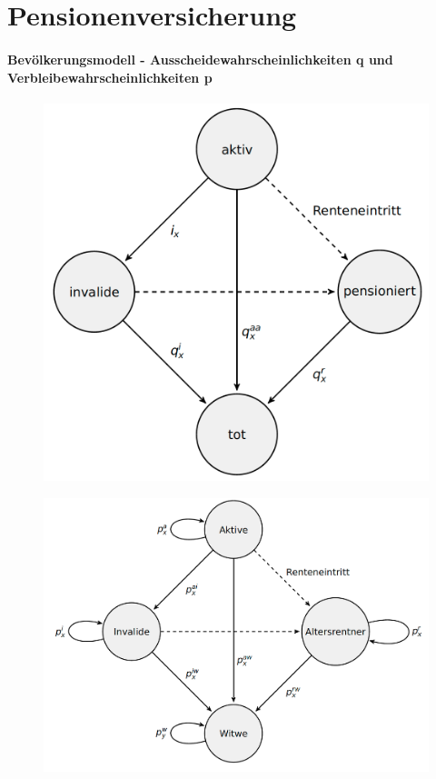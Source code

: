 \documentclass[12pt]{report}
\theoremstyle{dotless}
\theoremstyle{definition}
\begin{document}
\chapter{Pensionenversicherung}
\subsubsection{Bevölkerungsmodell - Ausscheidewahrscheinlichkeiten q und Verbleibewahrscheinlichkeiten p}

\begin{figure}[ht]
	\centering
	\includegraphics[width=.75\textwidth]{Bilder/Bevoelkerungsmodell.png}
\end{figure}

\begin{figure}[ht]
	\centering
	\includegraphics[width=.75\textwidth]{Bilder/Bevoelkerungsmodell2.png}
\end{figure}
\end{document}
